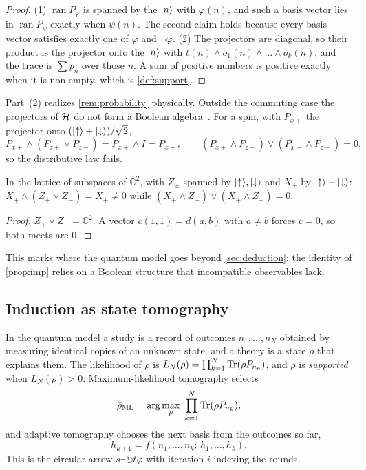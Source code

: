 \begin{proof}
(1) $\operatorname{ran}P_\varphi$ is spanned by the $\lvert n\rangle$ with $\varphi(n)$, and such a basis vector
lies in $\operatorname{ran}P_\psi$ exactly when $\psi(n)$. The second claim holds because every
basis vector satisfies exactly one of $\varphi$ and $\neg\varphi$.
(2) The projectors are diagonal, so their product is the projector onto the $\lvert n\rangle$ with
$t(n)\wedge o_1(n)\wedge\dots\wedge o_k(n)$, and the trace is $\sum p_n$ over those $n$. A sum of
positive numbers is positive exactly when it is non-empty, which is \cref{def:support}.
\end{proof}

Part~(2) realizes \cref{rem:probability} physically. Outside the commuting case the projectors
of $\mathcal H$ do not form a Boolean algebra~\cite{birkhoff,vonneumann}. For a spin, with $P_{x+}$ the
projector onto $(\lvert {\uparrow}\rangle+\lvert {\downarrow}\rangle)/\sqrt2$,
\[
  P_{x+}\wedge(P_{z+}\vee P_{z-})=P_{x+}\wedge I=P_{x+},
  \qquad
  (P_{x+}\wedge P_{z+})\vee(P_{x+}\wedge P_{z-})=0,
\]
so the distributive law fails.

\begin{proposition}\label{prop:nondistrib}
In the lattice of subspaces of $\mathbb C^2$, with $Z_\pm$ spanned by $\lvert {\uparrow}\rangle,\lvert {\downarrow}\rangle$ and $X_+$
by $\lvert {\uparrow}\rangle+\lvert {\downarrow}\rangle$: $X_+\wedge(Z_+\vee Z_-)=X_+\ne0$ while
$(X_+\wedge Z_+)\vee(X_+\wedge Z_-)=0$.
\end{proposition}

\begin{proof}
$Z_+\vee Z_-=\mathbb C^2$. A vector $c(1,1)=d(a,b)$ with $a\ne b$ forces $c=0$, so both meets are $0$.
\end{proof}

This marks where the quantum model goes beyond
\cref{sec:deduction}: the identity of \cref{prop:imp} relies on a Boolean structure that
incompatible observables lack.

\subsection{Induction as state tomography}

In the quantum model a study is a record of outcomes $n_1,\dots,n_N$ obtained by measuring
identical copies of an unknown state, and a theory is a state $\rho$ that explains them. The
likelihood of $\rho$ is $L_N(\rho)=\prod_{k=1}^N\operatorname{Tr}(\rho P_{n_k})$, and $\rho$ is \emph{supported}
when $L_N(\rho)>0$. Maximum-likelihood tomography selects
\[
  \hat\rho_{\mathrm{ML}}=\arg\max_\rho\ \prod_{k=1}^N\Tr(\rho P_{n_k}),
\]
and adaptive tomography chooses the next basis from the outcomes so far,
\[
  h_{k+1}=f(n_1,\dots,n_k;\,h_1,\dots,h_k).
\]
This is the circular arrow $s\exists\circlearrowright
t\varphi$ with iteration $i$ indexing the rounds.

